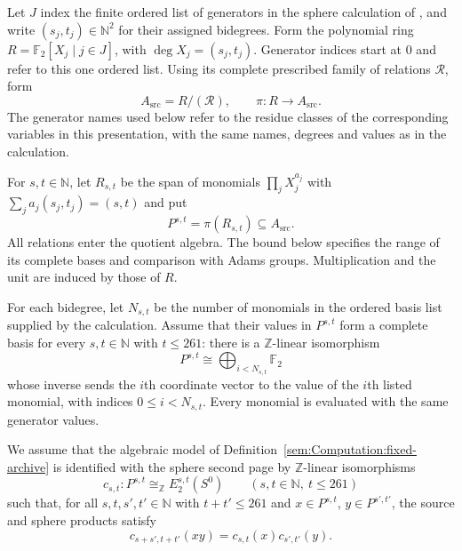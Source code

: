 \begin{definition}
\label{sem:Computation:fixed-archive}
Let $J$ index the finite ordered list of generators in the sphere
calculation of \cite{LinProgram}, and write
$(s_j,t_j)\in\mathbb N^2$ for their assigned bidegrees. Form the
polynomial ring $R=\mathbb F_2[X_j\mid j\in J]$, with
$\deg X_j=(s_j,t_j)$.
Generator indices start at $0$ and refer to this one ordered list.
Using its complete prescribed family of relations $\mathcal R$, form
\[
 A_{\mathrm{src}}=R/(\mathcal R),\qquad
 \pi:R\longrightarrow A_{\mathrm{src}}.
\]
The generator names used below refer to the residue classes of the
corresponding variables in this presentation, with the same names,
degrees and values as in the calculation.

For $s,t\in\mathbb N$, let $R_{s,t}$ be the span of monomials
$\prod_jX_j^{a_j}$ with $\sum_j a_j(s_j,t_j)=(s,t)$ and put
\[
 P^{s,t}=\pi(R_{s,t})\subseteq A_{\mathrm{src}}.
\]
All relations enter the quotient algebra. The bound below specifies
the range of its complete bases and comparison with Adams groups. Multiplication and the unit are
induced by those of $R$.

For each bidegree, let $N_{s,t}$ be the number of monomials in the
ordered basis list supplied by the calculation. Assume that their
values in $P^{s,t}$ form a complete basis for every $s,t\in\mathbb N$
with $t\le261$: there is a $\mathbb Z$-linear isomorphism
\[
 P^{s,t}\cong\bigoplus_{i<N_{s,t}}\mathbb F_2
\]
whose inverse sends the $i$th coordinate vector to the value of the
$i$th listed monomial, with indices $0\leq i<N_{s,t}$.
Every monomial is evaluated with the same generator values.
\end{definition}

\begin{proposition}
\label{sem:Computation:bounded-comparison}
We assume that the algebraic model of
Definition~\ref{sem:Computation:fixed-archive} is identified with the
sphere second page by $\mathbb Z$-linear isomorphisms
\[
c_{s,t}:P^{s,t}\cong_{\mathbb Z}E_2^{s,t}(S^0)
\qquad(s,t\in\mathbb N,\ t\leq261)
\]
such that, for all $s,t,s',t'\in\mathbb N$ with $t+t'\leq261$ and
$x\in P^{s,t}$, $y\in P^{s',t'}$, the source and sphere products satisfy
\[
c_{s+s',t+t'}(xy)=c_{s,t}(x)c_{s',t'}(y).
\]
\end{proposition}

